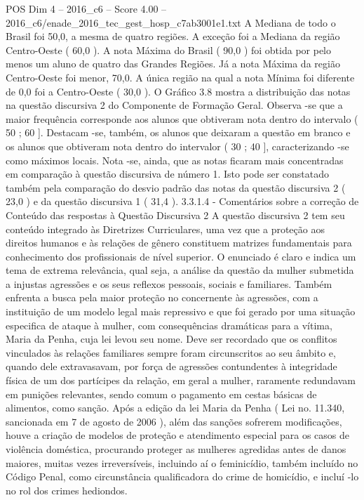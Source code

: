 \begin{textsample}{POS Dim 4 – 2016\_c6 – Score 4.00 – 2016\_c6/enade\_2016\_tec\_gest\_hosp\_c7ab3001e1.txt}
A Mediana de todo o Brasil foi 50,0, a mesma de quatro regiões.
A exceção foi a Mediana da região Centro-Oeste ( 60,0 ).
A nota Máxima do Brasil ( 90,0 ) foi obtida por pelo menos um aluno de quatro das Grandes Regiões.
Já a nota Máxima da região Centro-Oeste foi menor, 70,0.
A única região na qual a nota Mínima foi diferente de 0,0 foi a Centro-Oeste ( 30,0 ).
O Gráfico 3.8 mostra a distribuição das notas na questão discursiva 2 do Componente de Formação Geral.
Observa -se que a maior frequência corresponde aos alunos que obtiveram nota dentro do intervalo ( 50 ; 60 ].
Destacam -se, também, os alunos que deixaram a questão em branco e os alunos que obtiveram nota dentro do intervalor ( 30 ; 40 ], caracterizando -se como máximos locais.
Nota -se, ainda, que as notas ficaram mais concentradas em comparação à questão discursiva de número 1.
Isto pode ser constatado também pela comparação do desvio padrão das notas da questão discursiva 2 ( 23,0 ) e da questão discursiva 1 ( 31,4 ). 3.3.1.4 - Comentários sobre a correção de Conteúdo das respostas à Questão Discursiva 2 A questão discursiva 2 tem seu conteúdo integrado às Diretrizes Curriculares, uma vez que a proteção aos direitos humanos e às relações de gênero constituem matrizes fundamentais para conhecimento dos profissionais de nível superior.
O enunciado é claro e indica um tema de extrema relevância, qual seja, a análise da questão da mulher submetida a injustas agressões e os seus reflexos pessoais, sociais e familiares.
Também enfrenta a busca pela maior proteção no concernente às agressões, com a instituição de um modelo legal mais repressivo e que foi gerado por uma situação especifica de ataque à mulher, com consequências dramáticas para a vítima, Maria da Penha, cuja lei levou seu nome.
Deve ser recordado que os conflitos vinculados às relações familiares sempre foram circunscritos ao seu âmbito e, quando dele extravasavam, por força de agressões contundentes à integridade física de um dos partícipes da relação, em geral a mulher, raramente redundavam em punições relevantes, sendo comum o pagamento em cestas básicas de alimentos, como sanção.
Após a edição da lei Maria da Penha ( Lei no. 11.340, sancionada em 7 de agosto de 2006 ), além das sanções sofrerem modificações, houve a criação de modelos de proteção e atendimento especial para os casos de violência doméstica, procurando proteger as mulheres agredidas antes de danos maiores, muitas vezes irreversíveis, incluindo aí o feminicídio, também incluído no Código Penal, como circunstância qualificadora do crime de homicídio, e incluí -lo no rol dos crimes hediondos.

\end{textsample}
